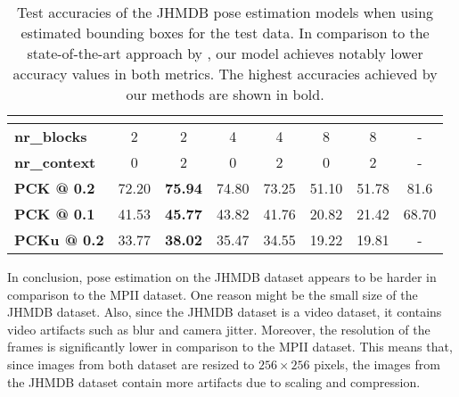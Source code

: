 \begin{table}[]
    \small
    \centering
    \begin{tabular}{|l|c|c|c|c|c|c|c|}
    \hline
         & & & & & & & \cite{song_thin-slicing_2017} \\ \hline
        \textbf{nr\_blocks} & 2 & 2 & 4 & 4 & 8 & 8 & -\\ \hline
        \textbf{nr\_context} & 0 & 2 & 0 & 2 & 0 & 2 & -\\ \hline
        \textbf{PCK @ 0.2} & 72.20 & \textbf{75.94} & 74.80 & 73.25 & 51.10 & 51.78 & 81.6 \\ \hline
        \textbf{PCK @ 0.1} & 41.53 & \textbf{45.77} & 43.82 & 41.76 & 20.82 & 21.42 & 68.70 \\ \hline
        \textbf{PCKu @ 0.2} & 33.77 & \textbf{38.02} & 35.47 & 34.55 & 19.22 & 19.81 & -\\ \hline
    \end{tabular}
    \caption{Test accuracies of the JHMDB pose estimation models when using estimated bounding boxes for the test data. In comparison to the state-of-the-art approach by \cite{song_thin-slicing_2017}, our model achieves notably lower accuracy values in both metrics. The highest accuracies achieved by our methods are shown in bold.}
    \label{tab:jhmdb_results_estimated}
\end{table}

In conclusion, pose estimation on the JHMDB dataset appears to be harder in comparison to the MPII dataset.
One reason might be the small size of the JHMDB dataset.
Also, since the JHMDB dataset is a video dataset, it contains video artifacts such as blur and camera jitter.
Moreover, the resolution of the frames is significantly lower in comparison to the MPII dataset.
This means that, since images from both dataset are resized to $256 \times 256$ pixels, the images from the JHMDB dataset contain more artifacts due to scaling and compression. 

